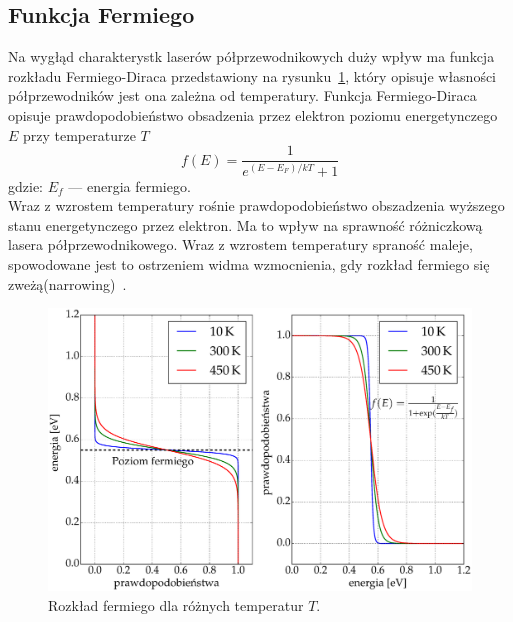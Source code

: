 \subsection{Funkcja Fermiego}
Na wygłąd charakterystk laserów półprzewodnikowych duży wpływ ma funkcja rozkładu Fermiego-Diraca przedstawiony na rysunku~\ref{fig:teoria_rys_3},
 który opisuje
własności półprzewodników jest ona zależna od temperatury. Funkcja Fermiego-Diraca opisuje prawdopodobieństwo obsadzenia przez elektron poziomu
energetynczego $E$ przy temperaturze $T$
\begin{equation}
f(E) = \frac{1}{e^{(E-E_F)/kT} + 1}
\end{equation}
gdzie: $E_f$ --- energia fermiego. \\
Wraz z wzrostem temperatury rośnie prawdopodobieństwo obszadzenia wyższego stanu energetynczego przez elektron. Ma to
wpływ na sprawność różniczkową lasera półprzewodnikowego. Wraz z wzrostem temperatury spraność maleje, spowodowane jest to ostrzeniem
widma wzmocnienia, gdy rozkład fermiego się zweżą(narrowing)~\cite{publikacja_1}.
\begin{figure}[H]
\center
  \includegraphics[scale=0.30]{fermi.eps}
  \caption{Rozkład fermiego dla różnych temperatur $T$.}
  \label{fig:teoria_rys_3}
\end{figure}
\newpage
